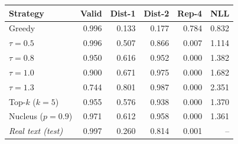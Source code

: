\footnotesize
\begin{tabular}{lrrrrr}
\toprule
Strategy & Valid & Dist-1 & Dist-2 & Rep-4 & NLL \\
\midrule
Greedy & 0.996 & 0.133 & 0.177 & 0.784 & 0.832 \\
$\tau=0.5$ & 0.996 & 0.507 & 0.866 & 0.007 & 1.114 \\
$\tau=0.8$ & 0.950 & 0.616 & 0.952 & 0.000 & 1.382 \\
$\tau=1.0$ & 0.900 & 0.671 & 0.975 & 0.000 & 1.682 \\
$\tau=1.3$ & 0.744 & 0.801 & 0.987 & 0.000 & 2.351 \\
Top-$k$ ($k=5$) & 0.955 & 0.576 & 0.938 & 0.000 & 1.370 \\
Nucleus ($p=0.9$) & 0.971 & 0.612 & 0.958 & 0.000 & 1.361 \\
\textit{Real text (test)} & 0.997 & 0.260 & 0.814 & 0.001 & -- \\
\bottomrule
\end{tabular}

